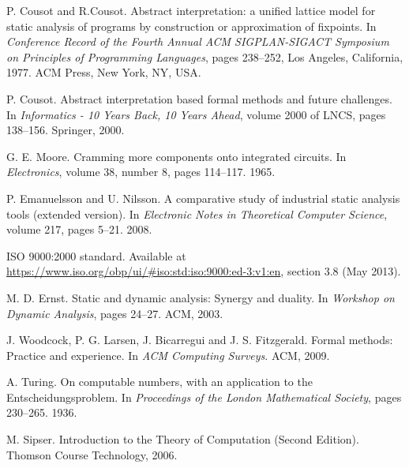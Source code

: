 \documentclass[12pt,final,oneside]{fithesis2}
\theoremstyle{definition}
\begin{document}
\renewcommand*{\bibname}{\chapter{Bibliography}\vspace{-1em}}
\begin{thebibliography}{99}

P{.} Cousot and R{.}Cousot.
\newblock Abstract interpretation: a unified lattice model for static
  analysis of programs by construction or approximation of fixpoints.
\newblock In \emph{Conference Record of the Fourth Annual ACM
  SIGPLAN-SIGACT Symposium on Principles of Programming Languages},
  pages 238--252, Los Angeles, California, 1977. ACM Press, New York,
  NY, USA.

P{.} Cousot.
\newblock Abstract interpretation based formal methods and future
  challenges.
\newblock In \emph{Informatics - 10 Years Back, 10 Years Ahead},
  volume 2000 of LNCS, pages 138--156. Springer, 2000.

G{.} E{.} Moore.
\newblock Cramming more components onto integrated circuits.
\newblock In \emph{Electronics}, volume 38, number 8, pages 114--117. 1965.

P{.} Emanuelsson and U{.} Nilsson.
\newblock A comparative study of industrial static analysis tools (extended
  version).
\newblock In \emph{Electronic Notes in Theoretical Computer Science},
  volume 217, pages 5--21. 2008.

\newblock ISO 9000:2000 standard.
\newblock Available at \url{https://www.iso.org/obp/ui/#iso:std:iso:9000:ed-3:v1:en},
  section 3.8 (May 2013).

M{.} D{.} Ernst.
\newblock Static and dynamic analysis: Synergy and duality.
\newblock In \emph{Workshop on Dynamic Analysis}, pages 24--27. ACM, 2003.

J{.} Woodcock, P{.} G{.} Larsen, J{.} Bicarregui and J{.} S{.} Fitzgerald.
\newblock Formal methods: Practice and experience.
\newblock In \emph{ACM Computing Surveys}. ACM, 2009.

A{.} Turing.
\newblock On computable numbers, with an application to the
  Entscheidungsproblem.
\newblock In \emph{Proceedings of the London Mathematical Society},
  pages 230--265. 1936.

M{.} Sipser.
\newblock Introduction to the Theory of Computation (Second Edition).
\newblock Thomson Course Technology, 2006.


\end{thebibliography}
\end{document}
